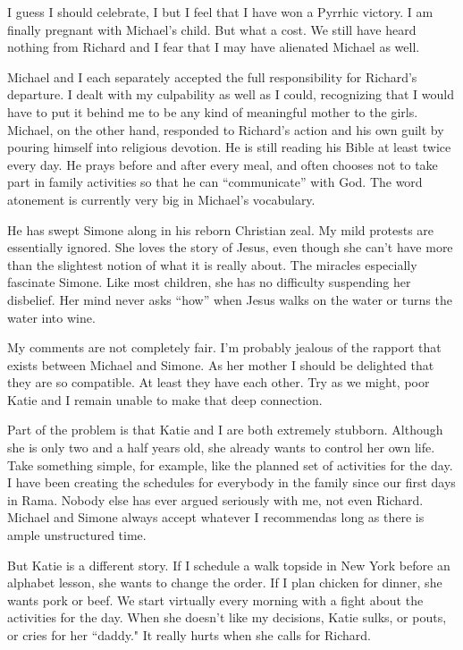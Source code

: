 \documentclass[]{article}
\begin{document}
I guess I should celebrate, I but I feel that I have won a Pyrrhic victory.  I am finally pregnant with Michael’s child.  But what a cost.  We still have heard nothing from Richard and I fear that I may have alienated Michael as well.

Michael and I each separately accepted the full responsibility for Richard’s departure.  I dealt with my culpability as well as I could, recognizing that I would have to put it behind me to be any kind of meaningful mother to the girls.  Michael, on the other hand, responded to Richard’s action and his own guilt by pouring himself into religious devotion.  He is still reading his Bible at least twice every day.  He prays before and after every meal, and often chooses not to take part in family activities so that he can “communicate” with God.  The word atonement is currently very big in Michael’s vocabulary.

He has swept Simone along in his reborn Christian zeal.  My mild protests are essentially ignored.  She loves the story of Jesus, even though she can’t have more than the slightest notion of what it is really about.  The miracles especially fascinate Simone.  Like most children, she has no difficulty suspending her disbelief.  Her mind never asks “how” when Jesus walks on the water or turns the water into wine.

My comments are not completely fair.  I’m probably jealous of the rapport that exists between Michael and Simone.  As her mother I should be delighted that they are so compatible.  At least they have each other.  Try as we might, poor Katie and I remain unable to make that deep connection.

Part of the problem is that Katie and I are both extremely stubborn.  Although she is only two and a half years old, she already wants to control her own life.  Take something simple, for example, like the planned set of activities for the day.  I have been creating the schedules for everybody in the family since our first days in Rama.  Nobody else has ever argued seriously with me, not even Richard.  Michael and Simone always accept whatever I recommendas long as there is ample unstructured time.

But Katie is a different story.  If I schedule a walk topside in New York before an alphabet lesson, she wants to change the order.  If I plan chicken for dinner, she wants pork or beef.  We start virtually every morning with a fight about the activities for the day.  When she doesn’t like my decisions, Katie sulks, or pouts, or cries for her “daddy."  It really hurts when she calls for Richard.
\end{document}

